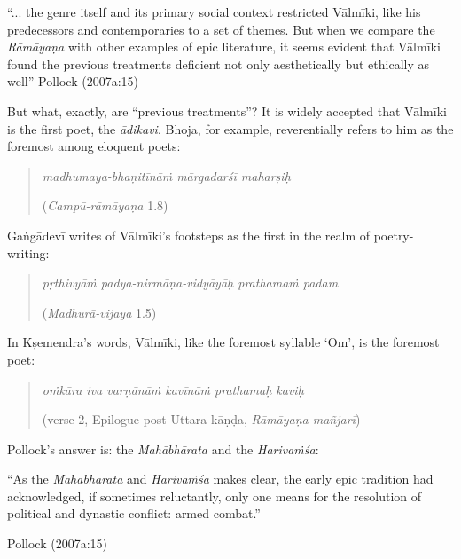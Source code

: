 \begin{myquote}
“... the genre itself and its primary social context restricted Vālmīki, like his predecessors and contemporaries to a set of themes. But when we compare the {\sl Rāmāyaṇa} with other examples of epic literature, it seems evident that Vālmīki found the previous treatments deficient not only aesthetically but ethically as well”
\hfill Pollock (2007a:15)
\end{myquote}

But what, exactly, are “previous treatments”? It is widely accepted that Vālmīki is the first poet, the {\sl ādikavi}. Bhoja, for example, reverentially refers to him as the foremost among eloquent poets:

\begin{quote}
{\sl madhumaya-bhaṇitīnāṁ mārgadarśī maharṣiḥ} 

\hfill ({\sl Campū-rāmāyaṇa} 1.8)
\end{quote}

Gaṅgādevī writes of Vālmīki’s footsteps as the first in the realm of poetry-writing:   

\begin{quote}
{\sl pṛthivyāṁ padya-nirmāṇa-vidyāyāḥ prathamaṁ padam} 

\hfill ({\sl Madhurā-vijaya} 1.5) 
\end{quote}

In Kṣemendra’s words, Vālmīki, like the foremost syllable ‘Om’, is the foremost poet:

\begin{quote}
{\sl oṁkāra iva varṇānāṁ kavīnāṁ prathamaḥ kaviḥ}

\hfill (verse 2, Epilogue post Uttara-kāṇḍa, {\sl Rāmāyaṇa-mañjarī})
\end{quote}

Pollock’s answer is: the {\sl Mahābhārata} and the {\sl Harivaṁśa}:

\begin{myquote}
“As the {\sl Mahābhārata} and {\sl Harivaṁśa} makes clear, the early epic tradition had acknowledged, if sometimes reluctantly, only one means for the resolution of political and dynastic conflict: armed combat.”

\hfill Pollock (2007a:15)
\end{myquote}


